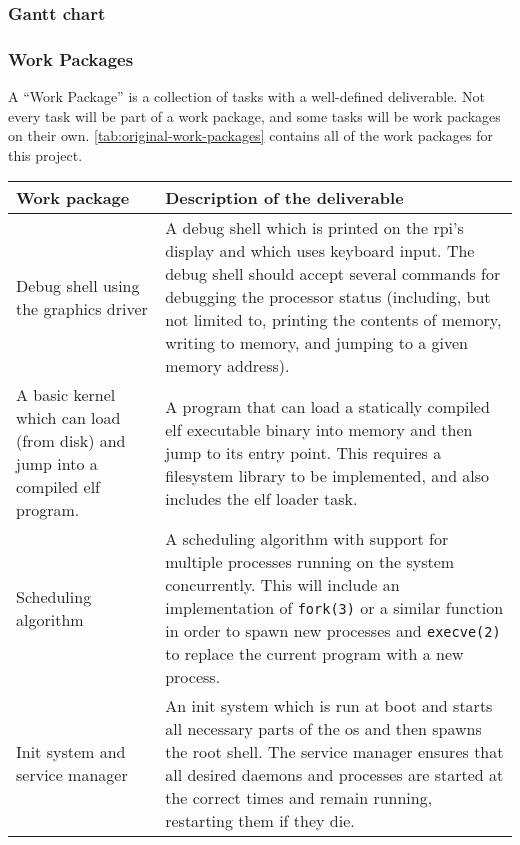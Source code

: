 \documentclass{article}
\begin{document}
\subsubsection{Gantt chart}


\subsubsection{Work Packages}
A ``Work Package'' is a collection of tasks with a well-defined deliverable.
Not every task will be part of a work package, and some tasks will be work
packages on their own. \autoref{tab:original-work-packages} contains all of the
work packages for this project.

\begin{table}[tbp]
\begin{center}
\begin{tabular}{|p{45mm}|p{125mm}|}
    \hline
    \textbf{Work package} & \textbf{Description of the deliverable} \\
    \hline
    Debug shell using the graphics driver &
    A debug shell which is printed on the \gls{rpi}'s display and which uses
    keyboard input. The debug shell should accept several commands for
    debugging the processor status (including, but not limited to, printing the
    contents of memory, writing to memory, and jumping to a given memory
    address).
    \\ \hline
    A basic kernel which can load (from disk) and jump into a compiled \gls{elf}
    program. &
    A program that can load a statically compiled \gls{elf} executable binary
    into memory and then jump to its entry point. This requires a filesystem
    library to be implemented, and also includes the \gls{elf} loader task.
    \\ \hline
    Scheduling algorithm &
    A scheduling algorithm with support for multiple processes running on the
    system concurrently. This will include an implementation of
    \texttt{fork(3)} or a similar function in order to spawn new processes and
    \texttt{execve(2)} to replace the current program with a new process.
    \\ \hline
    Init system and service manager &
    An init system which is run at boot and starts all necessary parts of the
    \gls{os} and then spawns the root shell. The service manager ensures that
    all desired daemons and processes are started at the correct times and
    remain running, restarting them if they die.
    \\ \hline

\end{tabular}
\end{center}
\end{table}
\end{document}
